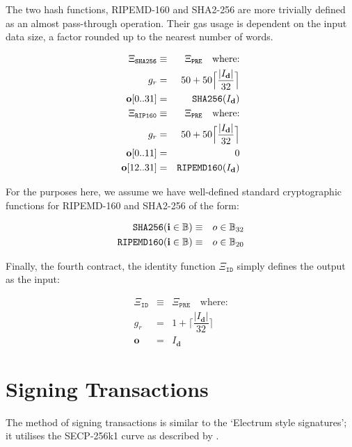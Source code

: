 \documentclass[9pt,oneside]{amsart}
\begin{document}
The two hash functions, RIPEMD-160 and SHA2-256 are more trivially defined as an almost pass-through operation. Their gas usage is dependent on the input data size, a factor rounded up to the nearest number of words.

\begin{eqnarray}
\Xi_{\mathtt{SHA256}} &\equiv& \Xi_{\mathtt{PRE}} \quad \text{where:} \\
g_r &=& 50 + 50\Big\lceil \dfrac{|I_\mathbf{d}|}{32} \Big\rceil\\
\mathbf{o}[0..31] &=& \mathtt{\tiny SHA256}(I_\mathbf{d})\\
\Xi_{\mathtt{RIP160}} &\equiv& \Xi_{\mathtt{PRE}} \quad \text{where:} \\
g_r &=& 50 + 50\Big\lceil \dfrac{|I_\mathbf{d}|}{32} \Big\rceil\\
\mathbf{o}[0..11] &=& 0 \\
\mathbf{o}[12..31] &=& \mathtt{\tiny RIPEMD160}(I_\mathbf{d})\\
\end{eqnarray}

For the purposes here, we assume we have well-defined standard cryptographic functions for RIPEMD-160 and SHA2-256 of the form:

\begin{eqnarray}
\mathtt{\small SHA256}(\mathbf{i} \in \mathbb{B}) & \equiv & o \in \mathbb{B}_{32} \\
\mathtt{\small RIPEMD160}(\mathbf{i} \in \mathbb{B}) & \equiv & o \in \mathbb{B}_{20}
\end{eqnarray}

Finally, the fourth contract, the identity function $\Xi_{\mathtt{ID}}$ simply defines the output as the input:

\begin{eqnarray}
\Xi_{\mathtt{ID}} &\equiv& \Xi_{\mathtt{PRE}} \quad \text{where:} \\
g_r &=& 1 + \Big\lceil \dfrac{|I_\mathbf{d}|}{32} \Big\rceil\\
\mathbf{o} &=& I_\mathbf{d}
\end{eqnarray}


\section{Signing Transactions}\label{app:signing}

The method of signing transactions is similar to the `Electrum style signatures'; it utilises the SECP-256k1 curve as described by \cite{gura2004comparing}.
\end{document}
